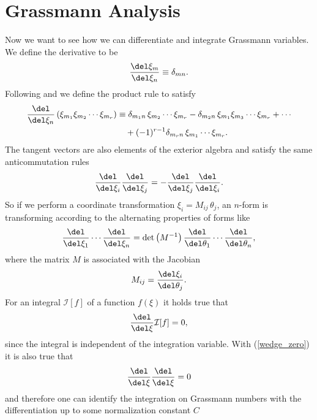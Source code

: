\section{Grassmann Analysis} \label{sec: grassmann_analysis}
Now we want to see how we can differentiate and integrate Grassmann variables. We define the derivative to be
\begin{equation}
\dfrac{\del \xi_{m}}{\del\xi_{n}}\equiv\delta_{m n} .
\end{equation}
Following \cite{Cartier:2002zp} and \cite{Berezin} we define the product rule to satisfy
\begin{align}
\dfrac{\del }{\del\xi_{n}} \left(\xi_{m_{1}}\xi_{m_{2}}\cdots \xi_{m_{r}}\right) &\equiv \delta_{m_{1} n}\,\xi_{m_{2}}\cdots\xi_{m_{r}}-\delta_{m_{2} n}\,\xi_{m_{1}} \xi_{m_{3}}\cdots \xi_{m_{r}} +\cdots  \notag \\
&\quad + (-1)^{r-1} \delta_{m_{r} n}\,\xi_{m_{1}}\cdots \xi_{m_{r}}.
\end{align}
The tangent vectors are also elements of the exterior algebra and satisfy the same anticommutation rules
\begin{equation}
\frac{\del }{\del \xi_{i}} \frac{\del }{\del\xi_{j}} = - \frac{\del }{\del \xi_{j}} \frac{\del }{\del\xi_{i}}.
\end{equation}
%
%
So if we perform a coordinate transformation $\xi_{i}=M_{ij}\,\theta_{j}$, an $n$-form is transforming according to the alternating properties of forms like
\begin{equation}
\frac{\del }{\del \xi_{1}}\cdots\frac{\del }{\del \xi_{n}} = \mathrm{det}\left(M^{-1}\right) \frac{\del }{\del \theta_{1}}\cdots \frac{\del }{\del \theta_{n}},
\label{coord_trafo}
\end{equation}
where the matrix $M$ is associated with the Jacobian
\begin{equation}
M_{ij}=\frac{\del \xi_{i}}{\del\theta_{j}}.
\end{equation}
For an integral $\mathcal{I}[f]$ of a function $f(\xi)$ it holds true that
\begin{equation}
\dfrac{\del}{\del \xi}\mathcal{I}[f] =0,
\end{equation}
since the integral is independent of the integration variable. With (\ref{wedge_zero}) it is also true that
\begin{equation}
\dfrac{\del}{\del \xi}\dfrac{\del}{\del \xi}=0
\end{equation}
and therefore one can identify the integration on Grassmann numbers with the differentiation up to some normalization constant $C$
